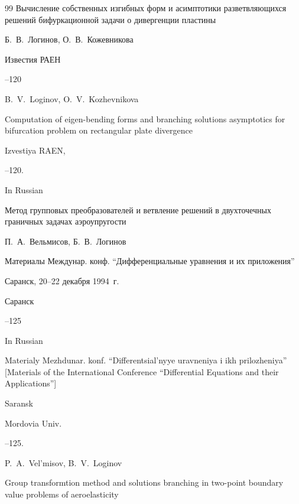 \begin{thebibliography}{99}
\paper Вычисление собственных изгибных форм и асимптотики разветвляющихся решений бифуркационной задачи о дивергенции пластины

\by  Б.~В.~Логинов, О.~В.~Кожевникова

\jour Известия РАЕН




--120

\misctransl

\by B.~V.~Loginov, O.~V.~Kozhevnikova

\paper Computation of eigen-bending forms and branching solutions asymptotics for bifurcation problem on rectangular plate divergence

\jour Izvestiya RAEN,




--120.

\lang In Russian




\paper Метод групповых преобразователей и ветвление решений в двухточечных граничных задачах аэроупругости

\by  П.~А.~Вельмисов, Б.~В.~Логинов

\inbook Материалы Междунар. конф. ``Дифференциальные уравнения и их приложения''

\procinfo Саранск, 20--22 декабря 1994~г.

\publaddr Саранск


--125


\misctransl

\lang In Russian

\inbook Materialy Mezhdunar. konf. ``Differentsial'nyye uravneniya i ikh prilozheniya'' \rm [Materials of the International Conference ``Differential Equations and their Applications'']

\publaddr Saransk

\publ  Mordovia Univ.


--125.

\by P.~A.~Vel'misov, B.~V.~Loginov

\paper Group transformtion method and solutions branching in two-point boundary value problems of aeroelasticity






\end{thebibliography}
